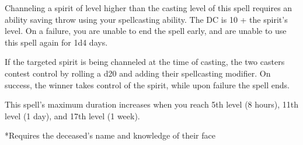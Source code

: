Channeling a spirit of level higher than the casting level of this spell requires an ability saving throw using your spellcasting ability. The DC is 10 + the spirit's level. On a failure, you are unable to end the spell early, and are unable to use this spell again for 1d4 days.

If the targeted spirit is being channeled at the time of casting, the two casters contest control by rolling a d20 and adding their spellcasting modifier. On success, the winner takes control of the spirit, while upon failure the spell ends.

This spell's maximum duration increases when you reach 5th level (8 hours), 11th level (1 day), and 17th level (1 week).

*Requires the deceased's name and knowledge of their face